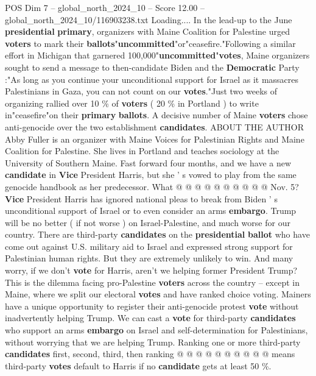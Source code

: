\begin{textsample}{POS Dim 7 – global\_north\_2024\_10 – Score 12.00 – global\_north\_2024\_10/116903238.txt}  \label{ex:f7_pos_093}
Loading....
In the lead-up to the June \textbf{presidential} \textbf{primary}, organizers with Maine Coalition for Palestine urged \textbf{voters} to mark their \textbf{ballots}"\textbf{uncommitted}"or"ceasefire."Following a similar effort in Michigan that garnered 100,000"\textbf{uncommitted}"\textbf{votes}, Maine organizers sought to send a message to then-candidate Biden and the \textbf{Democratic} Party :"As long as you continue your unconditional support for Israel as it massacres Palestinians in Gaza, you can not count on our \textbf{votes}."Just two weeks of organizing rallied over 10 \% of \textbf{voters} ( 20 \% in Portland ) to write in"ceasefire"on their \textbf{primary} \textbf{ballots}.
A decisive number of Maine \textbf{voters} chose anti-genocide over the two establishment \textbf{candidates}.
ABOUT THE AUTHOR Abby Fuller is an organizer with Maine Voices for Palestinian Rights and Maine Coalition for Palestine.
She lives in Portland and teaches sociology at the University of Southern Maine.
Fast forward four months, and we have a new \textbf{candidate} in \textbf{Vice} President Harris, but she ' s vowed to play from the same genocide handbook as her predecessor.
What @ @ @ @ @ @ @ @ @ @ Nov. 5? \textbf{Vice} President Harris has ignored national pleas to break from Biden ' s unconditional support of Israel or to even consider an arms \textbf{embargo}.
Trump will be no better ( if not worse ) on Israel-Palestine, and much worse for our country.
There are third-party \textbf{candidates} on the \textbf{presidential} \textbf{ballot} who have come out against U.S. military aid to Israel and expressed strong support for Palestinian human rights.
But they are extremely unlikely to win.
And many worry, if we don't \textbf{vote} for Harris, aren't we helping former President Trump?
This is the dilemma facing pro-Palestine \textbf{voters} across the country -- except in Maine, where we split our electoral \textbf{votes} and have ranked choice voting.
Mainers have a unique opportunity to register their anti-genocide protest \textbf{vote} without inadvertently helping Trump.
We can cast a \textbf{vote} for third-party \textbf{candidates} who support an arms \textbf{embargo} on Israel and self-determination for Palestinians, without worrying that we are helping Trump.
Ranking one or more third-party \textbf{candidates} first, second, third, then ranking @ @ @ @ @ @ @ @ @ @ means third-party \textbf{votes} default to Harris if no \textbf{candidate} gets at least 50 \%.

\end{textsample}
